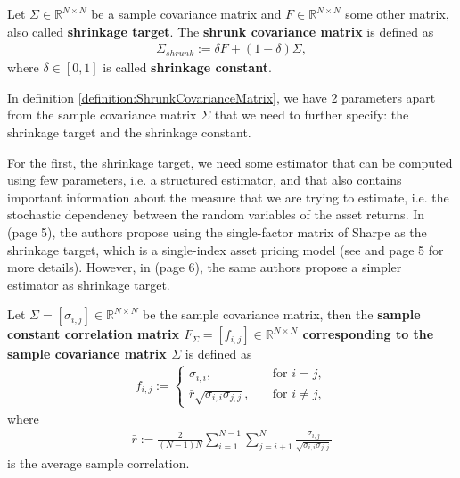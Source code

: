    	\begin{definition}\label{definition:ShrunkCovarianceMatrix}
    	    Let $\Sigma \in \mathbb{R}^{N \times N}$ be a sample covariance matrix and $F \in \mathbb{R}^{N \times N}$ some other matrix, also called \textbf{shrinkage target}. The \textbf{shrunk covariance matrix} is defined as
    	    \begin{align*}
    	        \Sigma_{shrunk} := \delta F + (1-\delta) \Sigma,
    	    \end{align*}
    	    where $\delta \in [0, 1 ]$ is called \textbf{shrinkage constant}.
    	\end{definition}
    	
    	In definition \ref{definition:ShrunkCovarianceMatrix}, we have 2 parameters apart from the sample covariance matrix $\Sigma$ that we need to further specify: the shrinkage target and the shrinkage constant.
    	
    	For the first, the shrinkage target, we need some estimator that can be computed using few parameters, i.e. a structured estimator, and that also contains important information about the measure that we are trying to estimate, i.e. the stochastic dependency between the random variables of the asset returns. In \cite{ledoit2003} (page 5), the authors propose using the single-factor matrix of Sharpe as the shrinkage target, which is a single-index asset pricing model (see \cite{sharpesim} and \cite{ledoit2003} page 5 for more details). However, in \cite{ledoit} (page 6), the same authors propose a simpler estimator as shrinkage target.
    	
    	\begin{definition}\label{definition:ConstantCorrelationModel}
    	    Let $\Sigma = [\sigma_{i,j}] \in \mathbb{R}^{N \times N}$ be the sample covariance matrix, then the \textbf{sample constant correlation matrix $F_{\Sigma} = [f_{i,j}] \in \mathbb{R}^{N \times N}$ corresponding to the sample covariance matrix $\Sigma$} is defined as
    	    \begin{align*}
    	        f_{i,j} := \begin{cases}
        	        \sigma_{i,i}, &\quad \text{for } i=j, \\
        	        \bar{r} \sqrt{\sigma_{i,i} \sigma_{j,j}}, &\quad \text{for } i \neq j,
    	        \end{cases}
    	    \end{align*}
    	    where
    	    \begin{align}\label{averagesamplecorrelation}
                \bar{r} := \frac{2}{(N-1) N} \sum_{i=1}^{N-1} \sum_{j=i+1}^N \frac{\sigma_{i,j}}{\sqrt{\sigma_{i,i} \sigma_{j,j}}}
    	    \end{align}
    	    is the average sample correlation.
    	\end{definition}
    	
